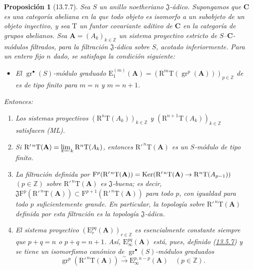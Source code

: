 \documentclass[10pt,oneside,openany]{book}
\theoremstyle{egaenv}\newtheorem*{env}{---}
\theoremstyle{egastatement}
\newtheorem*{proposition}{Proposición}
\theoremstyle{egadescription}
\newcommand{\oldpage}[2][]{\marginnote{\normalfont\scriptsize\textbf{#1}\,|\,#2}\ignorespaces}
\renewcommand{\to}{\mathchoice{\longrightarrow}{\rightarrow}{\rightarrow}{\rightarrow}}
\begin{document}
\begin{proposition}[13.7.7]
\label{0.13.7.7}
\label{0.13.7.7-fr}
Sea $S$ un anillo noetheriano $\mathfrak J$-ádico.
Supongamos que $\boldsymbol{C}$ es una categoría abeliana en la que todo objeto
es isomorfo a un subobjeto de un objeto inyectivo, y sea
$\mathrm T$ un funtor covariante aditivo de $\boldsymbol{C}$ en la
categoría de grupos abelianos.
Sea $\mathbf A=(A_k)_{k\in\mathbb Z}$ un
\oldpage[0\textsubscript{III}]{78}
sistema proyectivo estricto de $S$--$\boldsymbol{C}$-módulos filtrados, para la
filtración $\mathfrak J$-ádica sobre $S$, acotado inferiormente.
Para un entero fijo $n$ dado, se satisfaga la condición siguiente:
\begin{itemize}
\item[$(\mathrm F_n)$]
  \emph{El $\operatorname{gr}^\bullet(S)$-módulo graduado}
  $\mathrm E_1^{(m)}(\mathbf A)=
(\mathrm R^m\mathrm T(\operatorname{gr}^p(\mathbf A)))_{p\in\mathbb Z}$
  \emph{de  es de tipo finito para
  $m=n$ y $m=n+1$.}
\end{itemize}
Entonces:
\begin{enumerate}
  \item[{\rm(i)}] Los sistemas proyectivos
  $(\mathrm R^n\mathrm T(A_k))_{k\in\mathbb Z}$ y
  $(\mathrm R^{n+1}\mathrm T(A_k))_{k\in\mathbb Z}$ satisfacen {\rm(ML)}.
  \item[{\rm(ii)}] Si
  $\mathrm R'^{\,n}\mathrm T(\mathbf A)=
\varprojlim_k\mathrm R^n\mathrm T(A_k)$,
  entonces $\mathrm R'^{\,n}\mathrm T(\mathbf A)$ es un $S$-módulo de tipo finito.
\item[\rm(iii)] La filtración definida por $\mathrm F^p(\mathrm R'^{\,n}\mathrm T(\mathbf A))=
\operatorname{Ker}(\mathrm R'^{\,n}\mathrm T(\mathbf A)
\to\mathrm R^n\mathrm T(A_{p-1}))$ $(p\in\mathbb Z)$ sobre $\mathrm R'^{\,n}\mathrm T(\mathbf A)$ es $\mathfrak J$-buena; es decir,
  $\mathfrak J\mathrm F^p(\mathrm R'^{\,n}\mathrm T(\mathbf A))
\subset\mathrm F^{p+1}(\mathrm R'^{\,n}\mathrm T(\mathbf A))$
  para todo $p$, con igualdad para todo $p$ suficientemente grande.
  En particular, la topología sobre
  $\mathrm R'^{\,n}\mathrm T(\mathbf A)$ definida por esta filtración es la
  topología $\mathfrak J$-ádica.
  \item[{\rm(iv)}] El sistema proyectivo
  $(\mathrm E_r^{pq}(\mathbf A))_{r\in\mathbb Z}$ es esencialmente constante siempre que
  $p+q=n$ o $p+q=n+1$.
  Así, $\mathrm E_\infty^{pq}(\mathbf A)$ está, pues, definido \textup{(\hyperref[0.13.5.7-fr]{13.5.7})} y se tiene un isomorfismo canónico de $\operatorname{gr}^\bullet(S)$-módulos graduados
\begin{equation}
\label{0.13.7.7.1-fr}
\tag{13.7.7.1}
\operatorname{gr}^p(\mathrm R'^{\,n}\mathrm T(\mathbf A))
\xrightarrow{\sim}\mathrm E_\infty^{p,n-p}(\mathbf A)
\quad(p\in\mathbb Z).
\end{equation}
\end{enumerate}
\end{proposition}
\end{document}
